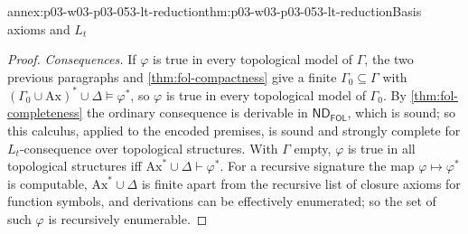 \begin{annexitem}{annex:p03-w03-p03-053-lt-reduction}{thm:p03-w03-p03-053-lt-reduction}{Basis axioms and \(L_t\)}
\begin{proof}
\emph{Consequences.} If \(\varphi\) is true in every topological model of
\(\Gamma\), the two previous paragraphs and
\cref{thm:fol-compactness} give a finite \(\Gamma_0\subseteq\Gamma\)
with \((\Gamma_0\cup\mathrm{Ax})^*\cup\Delta\models\varphi^*\), so
\(\varphi\) is true in every topological model of \(\Gamma_0\).
By \cref{thm:fol-completeness} the ordinary consequence is derivable
in \(\mathsf{ND}_{\mathsf{FOL}}\), which is sound; so this calculus,
applied to the encoded premises, is sound and strongly complete for
\(L_t\)-consequence over topological structures. With \(\Gamma\) empty,
\(\varphi\) is true in all topological structures iff
\(\mathrm{Ax}^*\cup\Delta\vdash\varphi^*\). For a recursive signature the
map \(\varphi\mapsto\varphi^*\) is computable, \(\mathrm{Ax}^*\cup\Delta\)
is finite apart from the recursive list of closure axioms for function
symbols, and derivations can be effectively enumerated; so the set of
such \(\varphi\) is recursively enumerable.
\end{proof}
\end{annexitem}

